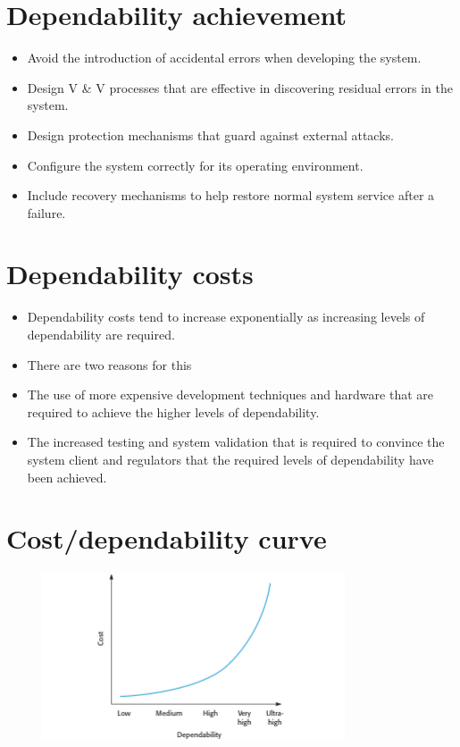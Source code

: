\section{Dependability achievement}
\begin{itemize}
\item Avoid the introduction of accidental errors when developing the system.

\item Design V \& V processes that are effective in discovering residual errors in the system.

\item Design protection mechanisms that guard against external attacks.

\item Configure the system correctly for its operating environment.

\item Include recovery mechanisms to help restore normal system service after a failure.

\end{itemize}
\section{Dependability costs}
\begin{itemize}
\item Dependability costs tend to increase exponentially as increasing levels of dependability are required.

\item There are two reasons for this

  \item The use of more expensive development techniques and hardware that are required to achieve the higher levels of dependability.
  \item The increased testing and system validation that is required to convince the system client and regulators that the required levels of dependability have been achieved.

\end{itemize}
\section{Cost/dependability curve}
\begin{figure}[h!]
    \centering
    \includegraphics[width = 0.8\textwidth]{./figures/L4_2.png}
    \caption{}
    \label{fig:L4_2}
\end{figure}


